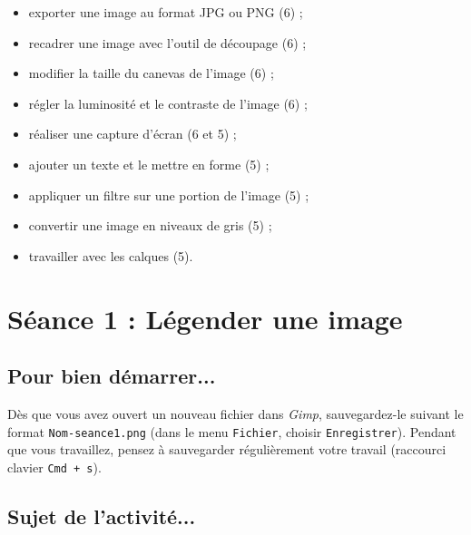 \begin{itemize}
\item exporter une image au format JPG ou PNG (6) ;
\item recadrer une image avec l'outil de découpage (6) ;
\item modifier la taille du canevas de l'image (6) ;
\item régler la luminosité et le contraste de l'image (6) ;
\item réaliser une capture d'écran (6 et 5) ;
\item ajouter un texte et le mettre en forme (5) ;
\item appliquer un filtre sur une portion de l'image (5) ;
\item convertir une image en niveaux de gris (5) ;
\item travailler avec les calques (5). 
\end{itemize}





%
%
%
%



\section{Séance 1 : Légender une image}\label{ficheImage4e2}

\subsection{Pour bien démarrer...}

Dès que vous avez ouvert un nouveau fichier dans \emph{Gimp}, sauvegardez-le suivant le format \texttt{Nom-seance1.png} (dans le menu \texttt{Fichier}, choisir \texttt{Enregistrer}). Pendant que vous travaillez, pensez à sauvegarder régulièrement votre travail (raccourci clavier \texttt{Cmd + s}).   



\subsection{Sujet de l'activité...}

\vspace{10pt}

